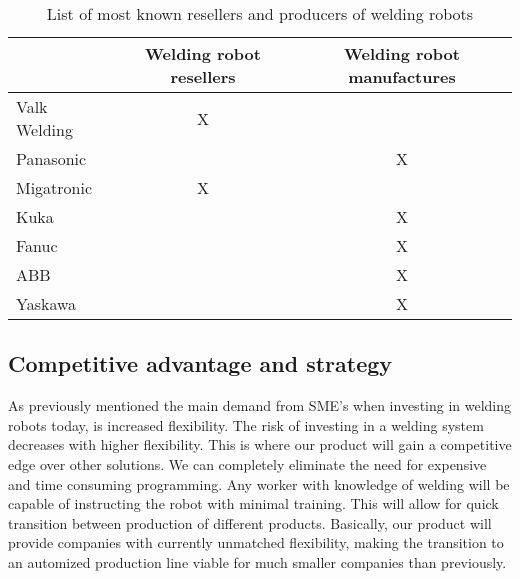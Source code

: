 \begin{table}[h]
\centering
\begin{tabular}{|l|c|c|}
\hline
             & Welding robot resellers & Welding robot manufactures \\ 
\hline
Valk Welding & X                       &  \\ 
\hline
Panasonic    &                         & X \\ 
\hline
Migatronic   & X                       &  \\ 
\hline
Kuka         &                         & X \\ 
\hline                                 
Fanuc        &                         & X \\ 
\hline                                 
ABB          &                         & X \\ 
\hline                                 
Yaskawa      &                         & X \\ 
\hline
\end{tabular} 
\caption{List of most known resellers and producers of welding robots}
\label{Tablecompetitors}
\end{table}


\subsection{Competitive advantage and strategy}
As previously mentioned the main demand from SME's when investing in welding robots today, is increased flexibility.
 The risk of investing in a welding system decreases with higher flexibility. This is where our product will gain a competitive edge over other solutions. We can completely eliminate the need for expensive and time consuming programming. Any worker with knowledge of welding will be capable of instructing the robot with minimal training. This will allow for quick transition between production of different products. Basically, our product will provide companies with currently unmatched flexibility, making the transition to an automized production line viable for much smaller companies than previously.
